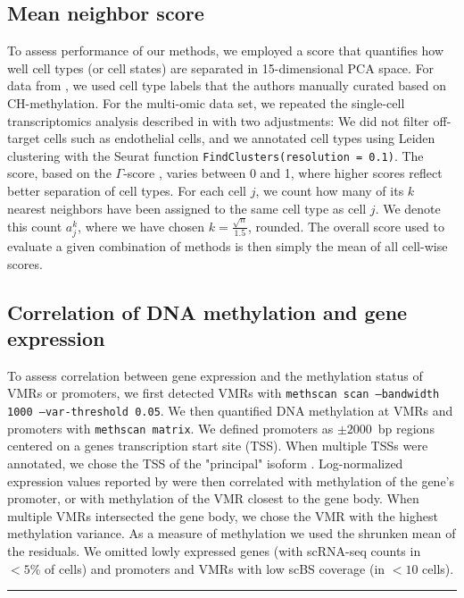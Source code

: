 \documentclass[twocolumn,10pt]{article}
\begin{document}
\subsection{Mean neighbor score} \label{methods:score}
To assess performance of our methods, we employed a score that quantifies how well cell types (or cell states) are separated in 15-dimensional PCA space.
For data from \citet{luo2017single}, we used cell type labels that the authors manually curated based on CH-methylation.
For the multi-omic data set, we repeated the single-cell transcriptomics analysis described in \citet{kremer_scnmt} with two adjustments:
We did not filter off-target cells such as endothelial cells, and we annotated cell types using Leiden clustering with the Seurat \citep{seurat} function \texttt{FindClusters(resolution = 0.1)}.
The score, based on the $\Gamma$-score \citep{Kireeva_2014}, varies between 0 and 1, where higher scores reflect better separation of cell types.
For each cell $j$, we count how many of its $k$ nearest neighbors have been assigned to the same cell type as cell $j$.
We denote this count $a^k_j$, where we have chosen $k=\frac{\sqrt{n}}{1.5}$, rounded.
The overall score used to evaluate a given combination of methods is then simply the mean of all cell-wise scores.

\subsection{Correlation of DNA methylation and gene expression}
To assess correlation between gene expression and the methylation status of VMRs or promoters, we first detected VMRs with \texttt{methscan scan --bandwidth 1000 --var-threshold 0.05}.
We then quantified DNA methylation at VMRs and promoters with \texttt{methscan matrix}.
We defined promoters as $\pm2000$~bp regions centered on a genes transcription start site (TSS).
When multiple TSSs were annotated, we chose the TSS of the "principal" isoform \citep{appris}.
Log-normalized expression values reported by \citet{kremer_scnmt} were then correlated with methylation of the gene's promoter, or with methylation of the VMR closest to the gene body.
When multiple VMRs intersected the gene body, we chose the VMR with the highest methylation variance.
As a measure of methylation we used the shrunken mean of the residuals.
We omitted lowly expressed genes (with scRNA-seq counts in $<5\%$ of cells) and promoters and VMRs with low scBS coverage (in $<10$ cells).

\vspace{1.4ex}
\noindent\hfil\rule{.6\columnwidth}{.2pt}\hfil
\end{document}
